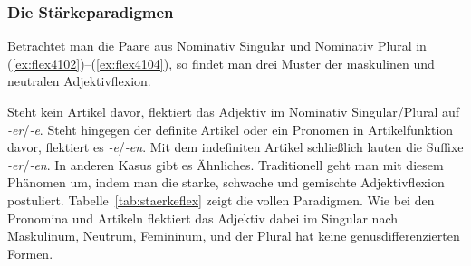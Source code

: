 \subsubsection{Die Stärkeparadigmen}


Betrachtet man die Paare aus Nominativ Singular und Nominativ Plural in (\ref{ex:flex4102})--(\ref{ex:flex4104}), so findet man drei Muster der maskulinen und neutralen Adjektivflexion.

\begin{exe}
  \ex \label{ex:flex4102}
  \begin{xlist}
  \end{xlist}
  \ex \label{ex:flex4103}
  \begin{xlist}
  \end{xlist}
  \ex \label{ex:flex4104}
  \begin{xlist}
  \end{xlist}
\end{exe}

Steht kein Artikel davor, flektiert das Adjektiv im Nominativ Singular\slash Plural auf \textit{-er}\slash \textit{-e}.
Steht hingegen der definite Artikel oder ein Pronomen in Artikelfunktion davor, flektiert es \textit{-e}\slash \textit{-en}.
Mit dem indefiniten Artikel schließlich lauten die Suffixe \textit{-er}/\textit{-en}.
In anderen Kasus gibt es Ähnliches.
Traditionell geht man mit diesem Phänomen um, indem man die starke, schwache und gemischte Adjektivflexion postuliert.
Tabelle~\ref{tab:staerkeflex} zeigt die vollen Paradigmen.
Wie bei den Pronomina und Artikeln flektiert das Adjektiv dabei im Singular nach Maskulinum, Neutrum, Femininum, und der Plural hat keine genusdifferenzierten Formen.

